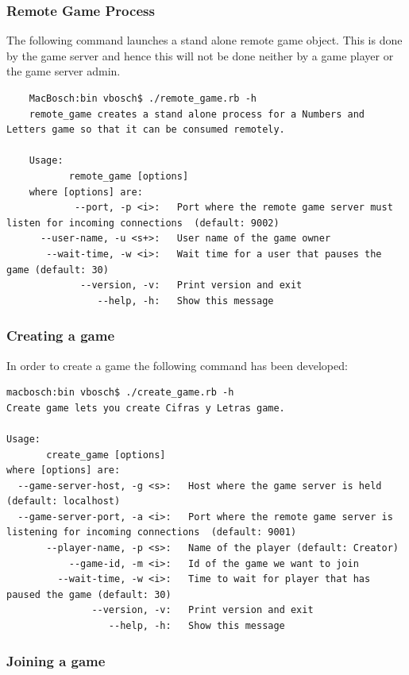\documentclass[a4paper,10pt,titlepage]{article}
\begin{document}
\subsubsection{Remote Game Process}

\par The following command launches a stand alone remote game object. This is done by the game server and hence this will not be done neither by a game player or the game server admin. 

{\footnotesize\begin{verbatim}
	MacBosch:bin vbosch$ ./remote_game.rb -h
	remote_game creates a stand alone process for a Numbers and Letters game so that it can be consumed remotely.

	Usage:
	       remote_game [options]
	where [options] are:
	        --port, -p <i>:   Port where the remote game server must listen for incoming connections  (default: 9002)
	  --user-name, -u <s+>:   User name of the game owner
	   --wait-time, -w <i>:   Wait time for a user that pauses the game (default: 30)
	         --version, -v:   Print version and exit
	            --help, -h:   Show this message
\end{verbatim}}

\subsubsection{Creating a game}

\par In order to create a game the following command has been developed:

{\footnotesize\begin{verbatim}
macbosch:bin vbosch$ ./create_game.rb -h
Create game lets you create Cifras y Letras game.

Usage:
       create_game [options]
where [options] are:
  --game-server-host, -g <s>:   Host where the game server is held (default: localhost)
  --game-server-port, -a <i>:   Port where the remote game server is listening for incoming connections  (default: 9001)
       --player-name, -p <s>:   Name of the player (default: Creator)
           --game-id, -m <i>:   Id of the game we want to join
         --wait-time, -w <i>:   Time to wait for player that has paused the game (default: 30)
               --version, -v:   Print version and exit
                  --help, -h:   Show this message
\end{verbatim}}

\subsubsection{Joining a game}
\end{document}
